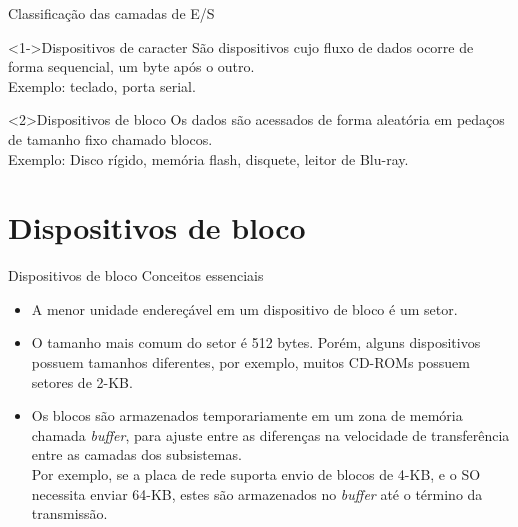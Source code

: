 \documentclass{beamer}
\begin{document}
\begin{frame}{Classificação das camadas de E/S}
  
  \begin{block}<1->{Dispositivos de caracter}
    São dispositivos cujo fluxo de dados ocorre de forma sequencial,
    um byte após o outro.\\
    \smallskip
    Exemplo: teclado, porta serial.
  \end{block}


  \begin{block}<2>{Dispositivos de bloco}
    Os dados são acessados de forma aleatória em pedaços de 
    tamanho fixo chamado blocos.\\
    \smallskip
    Exemplo: Disco rígido, memória flash, disquete, leitor de Blu-ray.    

  \end{block}

\end{frame}

\section{Dispositivos de bloco}

\begin{frame}{Dispositivos de bloco}
  {Conceitos essenciais}
  
  \begin{itemize}
    \item A menor unidade endereçável em um dispositivo de bloco é um \alert{setor}.
    \item O tamanho mais comum do setor é \alert{512} bytes. Porém, alguns dispositivos
      possuem tamanhos diferentes, por exemplo, muitos CD-ROMs possuem setores de 2-KB.
    \item Os blocos são armazenados temporariamente em um zona de memória chamada 
      \alert{\em buffer}, para ajuste entre as diferenças na velocidade de transferência entre
      as camadas dos subsistemas. \\
      \smallskip
      {\small Por exemplo, se a placa de rede suporta envio de blocos 
      de 4-KB, e o SO necessita enviar 64-KB, estes são armazenados no {\em buffer} até
      o término da transmissão.}

    \end{itemize}
        
\end{frame}

\end{document}

